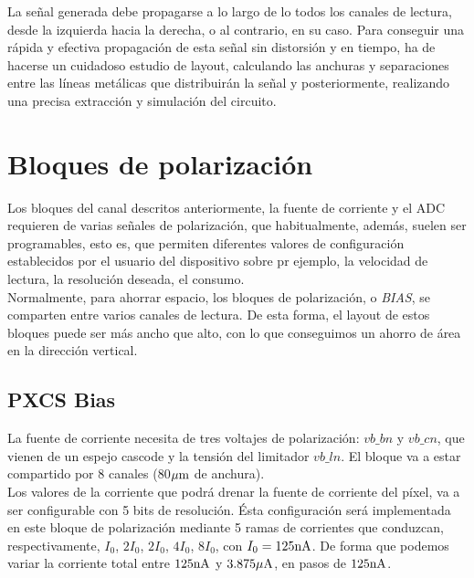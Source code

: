 La señal generada debe propagarse a lo largo de lo todos los canales de lectura,
desde la izquierda hacia la derecha, o al contrario, en su caso. Para conseguir
una rápida y efectiva propagación de esta señal sin distorsión y en tiempo, ha
de hacerse un cuidadoso estudio de layout, calculando las anchuras y separaciones
entre las líneas metálicas que distribuirán la señal y posteriormente, realizando
una precisa extracción y simulación del circuito.\\

\section{Bloques de polarización}\label{cap:ro_sch_bias}

Los bloques del canal descritos anteriormente, la fuente de corriente y el ADC
requieren de varias señales de polarización, que habitualmente, además, suelen
ser programables, esto es, que permiten diferentes valores de configuración
establecidos por el usuario del dispositivo sobre pr ejemplo, la velocidad de
lectura, la resolución deseada, el consumo.\\

Normalmente, para ahorrar espacio, los bloques de polarización, o \textit{BIAS},
se comparten entre varios canales de lectura. De esta forma, el layout de estos
bloques puede ser más ancho que alto, con lo que conseguimos un ahorro de área en
la dirección vertical.\\

\subsection{PXCS Bias}

La fuente de corriente necesita de tres voltajes de polarización: $vb\_bn$ y
$vb\_cn$, que vienen de un espejo cascode y la tensión del limitador $vb\_ln$.
El bloque va a estar compartido por 8 canales (80$\mu\text{m}$ de anchura).\\

Los valores de la corriente que podrá drenar la fuente de corriente del píxel, va
a ser configurable con 5 bits de resolución. Ésta configuración será implementada
en este bloque de polarización mediante 5 ramas de corrientes que conduzcan,
respectivamente, $I_0$, $2I_0$, $2I_0$, $4I_0$, $8I_0$, con
$I_0=125\text{nA}$. De forma que podemos variar la corriente total entre $125\text{nA}$ y
$3.875\mu\text{A}$, en pasos de $125\text{nA}$.\\

